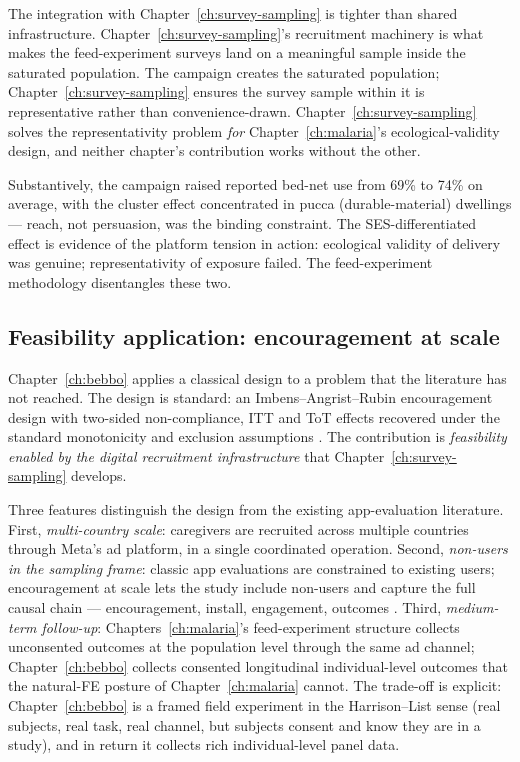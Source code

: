 The integration with Chapter~\ref{ch:survey-sampling} is tighter than shared infrastructure. Chapter~\ref{ch:survey-sampling}'s recruitment machinery is what makes the feed-experiment surveys land on a meaningful sample inside the saturated population. The campaign creates the saturated population; Chapter~\ref{ch:survey-sampling} ensures the survey sample within it is representative rather than convenience-drawn. Chapter~\ref{ch:survey-sampling} solves the representativity problem \emph{for} Chapter~\ref{ch:malaria}'s ecological-validity design, and neither chapter's contribution works without the other.

Substantively, the campaign raised reported bed-net use from 69\% to 74\% on average, with the cluster effect concentrated in pucca (durable-material) dwellings --- reach, not persuasion, was the binding constraint. The SES-differentiated effect is evidence of the platform tension in action: ecological validity of delivery was genuine; representativity of exposure failed. The feed-experiment methodology disentangles these two.

\subsection{Feasibility application: encouragement at scale}
\label{sec:intro:ch3}

Chapter~\ref{ch:bebbo} applies a classical design to a problem that the literature has not reached. The design is standard: an Imbens--Angrist--Rubin encouragement design with two-sided non-compliance, ITT and ToT effects recovered under the standard monotonicity and exclusion assumptions \citep{Imbens2015}. The contribution is \emph{feasibility enabled by the digital recruitment infrastructure} that Chapter~\ref{ch:survey-sampling} develops.

Three features distinguish the design from the existing app-evaluation literature. First, \emph{multi-country scale}: caregivers are recruited across multiple countries through Meta's ad platform, in a single coordinated operation. Second, \emph{non-users in the sampling frame}: classic app evaluations are constrained to existing users; encouragement at scale lets the study include non-users and capture the full causal chain --- encouragement, install, engagement, outcomes \citep{Bradlow1998}. Third, \emph{medium-term follow-up}: Chapters~\ref{ch:malaria}'s feed-experiment structure collects unconsented outcomes at the population level through the same ad channel; Chapter~\ref{ch:bebbo} collects consented longitudinal individual-level outcomes that the natural-FE posture of Chapter~\ref{ch:malaria} cannot. The trade-off is explicit: Chapter~\ref{ch:bebbo} is a framed field experiment in the Harrison--List sense (real subjects, real task, real channel, but subjects consent and know they are in a study), and in return it collects rich individual-level panel data.

